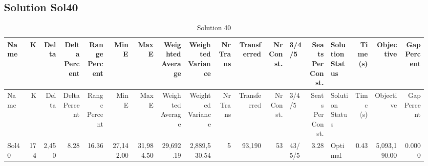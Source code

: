 \documentclass[a4paper]{article}
\begin{document}
\clearpage
\subsection{Solution Sol40}

{\scriptsize
\begin{longtable}{lrrrrrrrrrrrlrlrrr}
\caption{Solution 40}
\\ \toprule
Name &K &Delta &\shortstack{Delta\\Percent} &\shortstack{Range\\Percent} &Min E &Max E &\shortstack{Weighted\\Average} &\shortstack{Weighted\\Variance} &\shortstack{Nr\\Trans} &Transferred &\shortstack{Nr\\Const.} &3/4/5 &\shortstack{Seats\\Per\\Const.} &\shortstack{Solution\\Status} &\shortstack{Time\\(s)} &Objective &\shortstack{Gap\\Percent} \\ \midrule
\endfirsthead
\toprule
Name &K &Delta &\shortstack{Delta\\Percent} &\shortstack{Range\\Percent} &Min E &Max E &\shortstack{Weighted\\Average} &\shortstack{Weighted\\Variance} &\shortstack{Nr\\Trans} &Transferred &\shortstack{Nr\\Const.} &3/4/5 &\shortstack{Seats\\Per\\Const.} &\shortstack{Solution\\Status} &\shortstack{Time\\(s)} &Objective &\shortstack{Gap\\Percent} \\ \midrule
\endhead
\bottomrule
\endfoot
Sol40&174&2,450& 8.28&16.36&27,142.00&31,984.50&29,692.19&2,889,530.54&5&93,190&53&43/5/5& 3.28&Optimal& 0.43&5,093,190.00&0.0000\\ 
\end{longtable}

}
\end{document}
